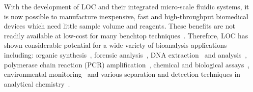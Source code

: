 
With the development of LOC and their integrated micro-scale fluidic systems, it is now possible to manufacture inexpensive, fast and high-throughput biomedical devices which need little sample volume and reagents. These benefits are not readily available at low-cost for many benchtop techniques~\cite{Kumar2010,Hosokawa2013}. Therefore, LOC has shown considerable potential for a wide variety of bioanalysis applications including: organic synthesis~\cite{Haswell2001,Watts2005}, forensic analysis~\cite{Verpoorte2002,Horsman2007}, DNA extraction~\cite{Oakley2009,Shaw2009} and analysis~\cite{Tegenfeldt2004}, polymerase chain reaction (PCR) amplification~\cite{Tegenfeldt2004}, chemical and biological assays~\cite{Ng2010}, environmental monitoring~\cite{Gardeniers2004,Marle2005} and various separation and detection techniques in analytical chemistry~\cite{Greenwood2002,Rios2006}.





